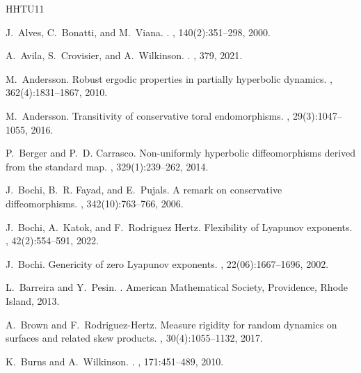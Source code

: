 \documentclass[11pt,letterpaper,reqno]{article}
\begin{document}

\begin{thebibliography}{HHTU11}

J.~Alves, C.~Bonatti, and M.~Viana.
.
, 140(2):351--298, 2000.

A.~Avila, S.~Crovisier, and A.~Wilkinson.
.
, 379, 2021.

M.~Andersson.
\newblock Robust ergodic properties in partially hyperbolic dynamics.
, 362(4):1831--1867, 2010.

M.~Andersson.
\newblock Transitivity of conservative toral endomorphisms.
, 29(3):1047--1055, 2016.

P.~Berger and P.~D. Carrasco.
\newblock Non-uniformly hyperbolic diffeomorphisms derived from the standard
  map.
, 329(1):239--262, 2014.

J.~Bochi, B.~R. Fayad, and E.~Pujals.
\newblock A remark on conservative diffeomorphisms.
, 342(10):763--766, 2006.

J.~Bochi, A.~Katok, and F.~Rodriguez Hertz.
\newblock Flexibility of {L}yapunov exponents.
, 42(2):554--591, 2022.

J.~Bochi.
\newblock Genericity of zero {L}yapunov exponents.
, 22(06):1667--1696, 2002.

L.~Barreira and Y.~Pesin.
.
\newblock American Mathematical Society, Providence, Rhode Island, 2013.

A.~Brown and F.~Rodriguez-Hertz.
\newblock Measure rigidity for random dynamics on surfaces and related skew
  products.
, 30(4):1055--1132,
  2017.

K.~Burns and A.~Wilkinson.
.
, 171:451--489, 2010.


\end{thebibliography}
\end{document}
